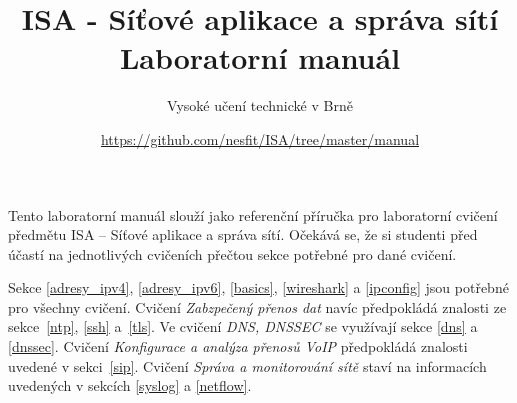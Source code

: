 \documentclass[a4paper,11pt]{article}
\title{ISA - Síťové aplikace a správa sítí\\
{\bf\large Laboratorní manuál}}
\author{Vysoké učení technické v Brně}
\date{\url{https://github.com/nesfit/ISA/tree/master/manual}}
\begin{document}
{\let\newpage\relax\maketitle}

Tento laboratorní manuál slouží jako referenční příručka pro laboratorní cvičení
předmětu ISA -- Síťové aplikace a správa sítí. Očekává se, že si studenti před
účastí na jednotlivých cvičeních přečtou sekce potřebné pro dané cvičení.

Sekce \ref{adresy_ipv4}, \ref{adresy_ipv6}, \ref{basics}, \ref{wireshark} a \ref{ipconfig} jsou
potřebné pro všechny cvičení. Cvičení \emph{Zabzpečený přenos dat} navíc
předpokládá znalosti ze sekce~\ref{ntp}, \ref{ssh} a~\ref{tls}. Ve cvičení \emph{DNS,
DNSSEC} se využívají sekce \ref{dns} a \ref{dnssec}. Cvičení
\emph{Konfigurace a analýza přenosů VoIP} předpokládá znalosti uvedené v
sekci~\ref{sip}. Cvičení \emph{Správa a monitorování sítě} staví na informacích
uvedených v sekcích \ref{syslog} a \ref{netflow}.

\setcounter{tocdepth}{1}
\tableofcontents
\newpage












\newpage




\newpage
\thispagestyle{empty}
\end{document}
